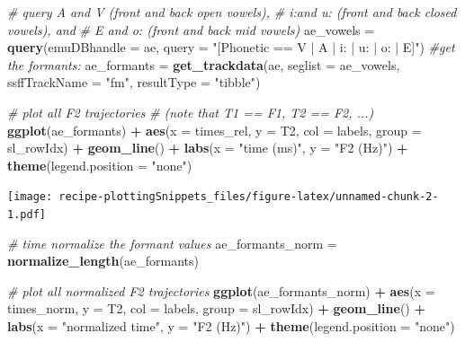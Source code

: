 \documentclass[]{book}
\newenvironment{Shaded}{\begin{snugshade}}{\end{snugshade}}
\newcommand{\CommentTok}[1]{\textcolor[rgb]{0.56,0.35,0.01}{\textit{#1}}}
\newcommand{\DataTypeTok}[1]{\textcolor[rgb]{0.13,0.29,0.53}{#1}}
\newcommand{\KeywordTok}[1]{\textcolor[rgb]{0.13,0.29,0.53}{\textbf{#1}}}
\newcommand{\NormalTok}[1]{#1}
\newcommand{\OperatorTok}[1]{\textcolor[rgb]{0.81,0.36,0.00}{\textbf{#1}}}
\newcommand{\StringTok}[1]{\textcolor[rgb]{0.31,0.60,0.02}{#1}}
\begin{document}
\begin{Shaded}
\begin{Highlighting}[]
\CommentTok{# query A and V (front and back open vowels),}
\CommentTok{# i:and u: (front and back closed vowels), and}
\CommentTok{# E and o: (front and back mid vowels)}
\NormalTok{ae_vowels =}\StringTok{ }\KeywordTok{query}\NormalTok{(}\DataTypeTok{emuDBhandle =}\NormalTok{ ae,}
                  \DataTypeTok{query =} \StringTok{"[Phonetic == V | A | i: | u: | o: | E]"}\NormalTok{)}
\CommentTok{#get the formants:}
\NormalTok{ae_formants =}\StringTok{ }\KeywordTok{get_trackdata}\NormalTok{(ae, }
                            \DataTypeTok{seglist =}\NormalTok{ ae_vowels,}
                            \DataTypeTok{ssffTrackName =} \StringTok{"fm"}\NormalTok{,}
                            \DataTypeTok{resultType =} \StringTok{"tibble"}\NormalTok{)}

\CommentTok{# plot all F2 trajectories}
\CommentTok{# (note that T1 == F1, T2 == F2, ...)}
\KeywordTok{ggplot}\NormalTok{(ae_formants) }\OperatorTok{+}
\StringTok{  }\KeywordTok{aes}\NormalTok{(}\DataTypeTok{x =}\NormalTok{ times_rel, }\DataTypeTok{y =}\NormalTok{ T2, }\DataTypeTok{col =}\NormalTok{ labels, }\DataTypeTok{group =}\NormalTok{ sl_rowIdx) }\OperatorTok{+}
\StringTok{  }\KeywordTok{geom_line}\NormalTok{() }\OperatorTok{+}
\StringTok{  }\KeywordTok{labs}\NormalTok{(}\DataTypeTok{x =} \StringTok{"time (ms)"}\NormalTok{, }\DataTypeTok{y =} \StringTok{"F2 (Hz)"}\NormalTok{) }\OperatorTok{+}
\StringTok{  }\KeywordTok{theme}\NormalTok{(}\DataTypeTok{legend.position =} \StringTok{"none"}\NormalTok{)}
\end{Highlighting}
\end{Shaded}

\texttt{[image: recipe-plottingSnippets\_files/figure-latex/unnamed-chunk-2-1.pdf]}

\begin{Shaded}
\begin{Highlighting}[]
\CommentTok{# time normalize the formant values}
\NormalTok{ae_formants_norm =}\StringTok{ }\KeywordTok{normalize_length}\NormalTok{(ae_formants)}

\CommentTok{# plot all normalized F2 trajectories}
\KeywordTok{ggplot}\NormalTok{(ae_formants_norm) }\OperatorTok{+}
\StringTok{  }\KeywordTok{aes}\NormalTok{(}\DataTypeTok{x =}\NormalTok{ times_norm, }\DataTypeTok{y =}\NormalTok{ T2, }\DataTypeTok{col =}\NormalTok{ labels, }\DataTypeTok{group =}\NormalTok{ sl_rowIdx) }\OperatorTok{+}
\StringTok{  }\KeywordTok{geom_line}\NormalTok{() }\OperatorTok{+}
\StringTok{  }\KeywordTok{labs}\NormalTok{(}\DataTypeTok{x =} \StringTok{"normalized time"}\NormalTok{, }\DataTypeTok{y =} \StringTok{"F2 (Hz)"}\NormalTok{) }\OperatorTok{+}
\StringTok{  }\KeywordTok{theme}\NormalTok{(}\DataTypeTok{legend.position =} \StringTok{"none"}\NormalTok{)}
\end{Highlighting}
\end{Shaded}
\end{document}
